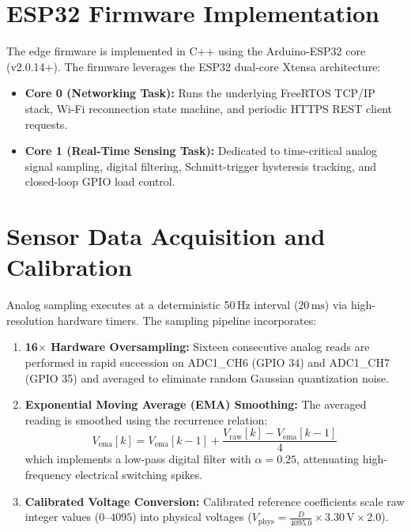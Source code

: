 \section{ESP32 Firmware Implementation}
The edge firmware is implemented in C++ using the Arduino-ESP32 core (v2.0.14+). The firmware leverages the ESP32 dual-core Xtensa architecture:
\begin{itemize}
    \item \textbf{Core 0 (Networking Task):} Runs the underlying FreeRTOS TCP/IP stack, Wi-Fi reconnection state machine, and periodic HTTPS REST client requests.
    \item \textbf{Core 1 (Real-Time Sensing Task):} Dedicated to time-critical analog signal sampling, digital filtering, Schmitt-trigger hysteresis tracking, and closed-loop GPIO load control.
\end{itemize}

\section{Sensor Data Acquisition and Calibration}
Analog sampling executes at a deterministic 50\,Hz interval ($20\,\text{ms}$) via high-resolution hardware timers. The sampling pipeline incorporates:
\begin{enumerate}
    \item \textbf{16$\times$ Hardware Oversampling:} Sixteen consecutive analog reads are performed in rapid succession on ADC1\_CH6 (GPIO 34) and ADC1\_CH7 (GPIO 35) and averaged to eliminate random Gaussian quantization noise.
    \item \textbf{Exponential Moving Average (EMA) Smoothing:} The averaged reading is smoothed using the recurrence relation:
    \begin{equation}
    V_{\text{ema}}[k] = V_{\text{ema}}[k-1] + \frac{V_{\text{raw}}[k] - V_{\text{ema}}[k-1]}{4}
    \end{equation}
    which implements a low-pass digital filter with $\alpha = 0.25$, attenuating high-frequency electrical switching spikes.
    \item \textbf{Calibrated Voltage Conversion:} Calibrated reference coefficients scale raw integer values ($0\text{--}4095$) into physical voltages ($V_{\text{phys}} = \frac{D}{4095.0} \times 3.30\,\text{V} \times 2.0$).
\end{enumerate}

